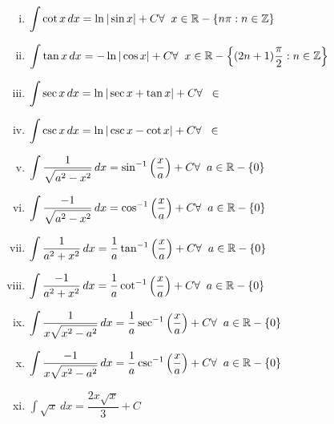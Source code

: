 \documentclass{article}
\begin{document}
\begin{enumerate}[i.]
    \item $\displaystyle\int \cot x \, dx=\ln |\sin x| +C \hfill \forall \hspace{2mm} x \in \mathbb{R}-\left\{n\pi:n\in \mathbb{Z}\right\}$
    \item $\displaystyle\int \tan x \, dx=-\ln |\cos x| +C \hfill \forall \hspace{2mm} x \in \mathbb{R}-\left\{(2n+1)\dfrac{\pi}{2}:n\in \mathbb{Z}\right\}$
    \item $\displaystyle\int \sec x \, dx=\ln |\sec x + \tan x| +C \hfill \forall \hspace{2mm}  \in $
    \item $\displaystyle\int \csc x \, dx=\ln |\csc x-\cot x| +C \hfill \forall \hspace{2mm}  \in $
    \item $\displaystyle\int \dfrac{1}{\displaystyle\sqrt{a^2-x^2}} \, dx=\sin^{-1} \left(\dfrac{x}{a}\right) +C \hfill \forall \hspace{2mm}  a\in \mathbb{R}-\left\{0\right\}$
    \item $\displaystyle\int \dfrac{-1}{\displaystyle\sqrt{a^2-x^2}} \, dx=\cos^{-1} \left(\frac{x}{a}\right) +C \hfill \forall \hspace{2mm}  a\in\mathbb{R}-\left\{0\right\} $
    \item $\displaystyle\int \dfrac{1}{a^2+x^2} \, dx=\frac{1}{a} \tan^{-1}\left(\frac{x}{a}\right)+C \hfill \forall \hspace{2mm} a \in \mathbb{R}-\left\{0\right\}$
    \item $\displaystyle\int \dfrac{-1}{a^2+x^2} \, dx=\frac{1}{a} \cot^{-1}\left(\frac{x}{a}\right)+C \hfill \forall \hspace{2mm} a \in \mathbb{R}-\left\{0\right\}$
    \item $\displaystyle\int \frac{1}{x\displaystyle\sqrt{x^2-a^2}} \, dx=\frac{1}{a}\sec^{-1}\left(\frac{x}{a}\right)  +C \hfill \forall \hspace{2mm} a \in \mathbb{R}-\left\{0\right\}$
    \item $\displaystyle\int \dfrac{-1}{x\displaystyle\sqrt{x^2-a^2}} \, dx=\frac{1}{a}\csc^{-1}\left(\frac{x}{a}\right) +C \hfill \forall \hspace{2mm} a \in \mathbb{R}-\left\{0\right\}$
    \item $\displaystyle\int \sqrt{x} \, dx=\dfrac{2x\sqrt{x}}{3}+C$

\end{enumerate}
\end{document}
